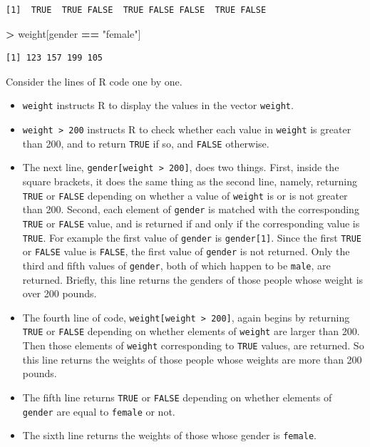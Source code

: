 \documentclass[]{krantz}
\makeatletter
\newenvironment{Shaded}{\begin{snugshade}}{\end{snugshade}}
\newcommand{\StringTok}[1]{\textcolor[rgb]{0.5,0.5,0.5}{#1}}
\newcommand{\OperatorTok}[1]{\textcolor[rgb]{0.43,0.43,0.43}{\textbf{#1}}}
\newcommand{\NormalTok}[1]{#1}
\providecommand{\tightlist}{%
  \setlength{\itemsep}{0pt}\setlength{\parskip}{0pt}}
\newenvironment{kframe}{%
\medskip{}
\setlength{\fboxsep}{.8em}
 \def\at@end@of@kframe{}%
 \ifinner\ifhmode%
  \def\at@end@of@kframe{\end{minipage}}%
  \begin{minipage}{\columnwidth}%
 \fi\fi%
 \def\FrameCommand##1{\hskip\@totalleftmargin \hskip-\fboxsep
 \colorbox{shadecolor}{##1}\hskip-\fboxsep
     \hskip-\linewidth \hskip-\@totalleftmargin \hskip\columnwidth}%
 \MakeFramed {\advance\hsize-\width
   \@totalleftmargin\z@ \linewidth\hsize
   \@setminipage}}%
 {\par\unskip\endMakeFramed%
 \at@end@of@kframe}
\renewenvironment{Shaded}{\begin{kframe}}{\end{kframe}}
\makeatother
\begin{document}
\begin{verbatim}
[1]  TRUE  TRUE FALSE  TRUE FALSE FALSE  TRUE FALSE
\end{verbatim}

\begin{Shaded}
\begin{Highlighting}[]
\OperatorTok{>}\StringTok{ }\NormalTok{weight[gender }\OperatorTok{==}\StringTok{ "female"}\NormalTok{]}
\end{Highlighting}
\end{Shaded}

\begin{verbatim}
[1] 123 157 199 105
\end{verbatim}

Consider the lines of R code one by one.

\begin{itemize}
\tightlist
\item
  \texttt{weight} instructs R to display the values in the vector
  \texttt{weight}.
\item
  \texttt{weight\ \textgreater{}\ 200} instructs R to check whether each
  value in \texttt{weight} is greater than 200, and to return
  \texttt{TRUE} if so, and \texttt{FALSE} otherwise.
\item
  The next line, \texttt{gender{[}weight\ \textgreater{}\ 200{]}}, does
  two things. First, inside the square brackets, it does the same thing
  as the second line, namely, returning \texttt{TRUE} or \texttt{FALSE}
  depending on whether a value of \texttt{weight} is or is not greater
  than 200. Second, each element of \texttt{gender} is matched with the
  corresponding \texttt{TRUE} or \texttt{FALSE} value, and is returned
  if and only if the corresponding value is \texttt{TRUE}. For example
  the first value of \texttt{gender} is \texttt{gender{[}1{]}}. Since
  the first \texttt{TRUE} or \texttt{FALSE} value is \texttt{FALSE}, the
  first value of \texttt{gender} is not returned. Only the third and
  fifth values of \texttt{gender}, both of which happen to be
  \texttt{male}, are returned. Briefly, this line returns the genders of
  those people whose weight is over 200 pounds.
\item
  The fourth line of code,
  \texttt{weight{[}weight\ \textgreater{}\ 200{]}}, again begins by
  returning \texttt{TRUE} or \texttt{FALSE} depending on whether
  elements of \texttt{weight} are larger than 200. Then those elements
  of \texttt{weight} corresponding to \texttt{TRUE} values, are
  returned. So this line returns the weights of those people whose
  weights are more than 200 pounds.
\item
  The fifth line returns \texttt{TRUE} or \texttt{FALSE} depending on
  whether elements of \texttt{gender} are equal to \texttt{female} or
  not.
\item
  The sixth line returns the weights of those whose gender is
  \texttt{female}.
\end{itemize}
\end{document}

